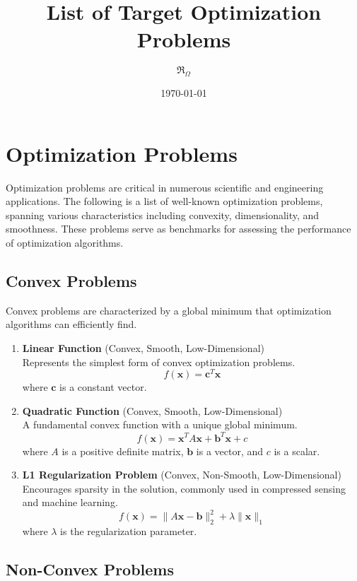 \documentclass{article}
\title{List of Target Optimization Problems}
\author{$\mathfrak{R}_{\Omega}$}
\date{\today}
\begin{document}
\maketitle

\section{Optimization Problems}

Optimization problems are critical in numerous scientific and engineering applications. The following is a list of well-known optimization problems, spanning various characteristics including convexity, dimensionality, and smoothness. These problems serve as benchmarks for assessing the performance of optimization algorithms.

\subsection{Convex Problems}

Convex problems are characterized by a global minimum that optimization algorithms can efficiently find.

\begin{enumerate}
    \item \textbf{Linear Function} (Convex, Smooth, Low-Dimensional) \\
    Represents the simplest form of convex optimization problems.
    \[ f(\mathbf{x}) = \mathbf{c}^T \mathbf{x} \]
    where $\mathbf{c}$ is a constant vector.

    \item \textbf{Quadratic Function} (Convex, Smooth, Low-Dimensional) \\
    A fundamental convex function with a unique global minimum.
    \[ f(\mathbf{x}) = \mathbf{x}^T A \mathbf{x} + \mathbf{b}^T \mathbf{x} + c \]
    where $A$ is a positive definite matrix, $\mathbf{b}$ is a vector, and $c$ is a scalar.

    \item \textbf{L1 Regularization Problem} (Convex, Non-Smooth, Low-Dimensional) \\
    Encourages sparsity in the solution, commonly used in compressed sensing and machine learning.
    \[ f(\mathbf{x}) = \|A\mathbf{x} - \mathbf{b}\|_2^2 + \lambda \|\mathbf{x}\|_1 \]
    where $\lambda$ is the regularization parameter.
\end{enumerate}

\subsection{Non-Convex Problems}
\end{document}
